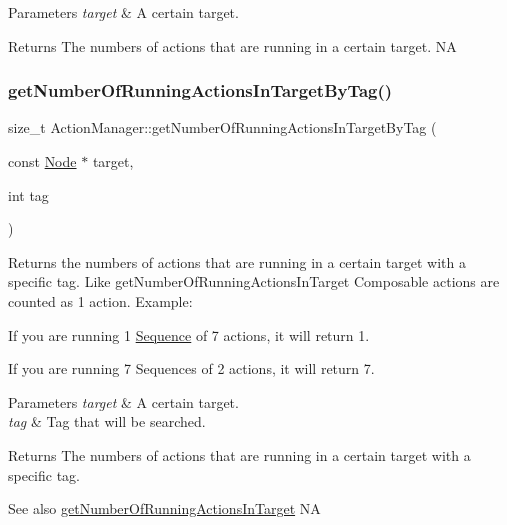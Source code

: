 \begin{DoxyParams}{Parameters}
{\em target} & A certain target. \\
\hline
\end{DoxyParams}
\begin{DoxyReturn}{Returns}
The numbers of actions that are running in a certain target.  NA 
\end{DoxyReturn}
\mbox{\label{classActionManager_aa516eb2a5603e824ea95e6ca783cead0}} 
\subsubsection{\texorpdfstring{get\+Number\+Of\+Running\+Actions\+In\+Target\+By\+Tag()}{getNumberOfRunningActionsInTargetByTag()}}
{\footnotesize\ttfamily size\+\_\+t Action\+Manager\+::get\+Number\+Of\+Running\+Actions\+In\+Target\+By\+Tag (\begin{DoxyParamCaption}\item[{const \hyperlink{classNode}{Node} $\ast$}]{target,  }\item[{int}]{tag }\end{DoxyParamCaption})\hspace{0.3cm}{\ttfamily [virtual]}}

Returns the numbers of actions that are running in a certain target with a specific tag. Like get\+Number\+Of\+Running\+Actions\+In\+Target Composable actions are counted as 1 action. Example\+:
\begin{DoxyItemize}
\item If you are running 1 \hyperlink{classSequence}{Sequence} of 7 actions, it will return 1.
\item If you are running 7 Sequences of 2 actions, it will return 7.
\end{DoxyItemize}


\begin{DoxyParams}{Parameters}
{\em target} & A certain target. \\
\hline
{\em tag} & Tag that will be searched. \\
\hline
\end{DoxyParams}
\begin{DoxyReturn}{Returns}
The numbers of actions that are running in a certain target with a specific tag. 
\end{DoxyReturn}
\begin{DoxySeeAlso}{See also}
\hyperlink{classActionManager_add35fb2d5810bec63b59f432830746bc}{get\+Number\+Of\+Running\+Actions\+In\+Target}  NA 
\end{DoxySeeAlso}
\mbox{\label{classActionManager_a9c8575014bda8867759c63aa17c519c3}} 
